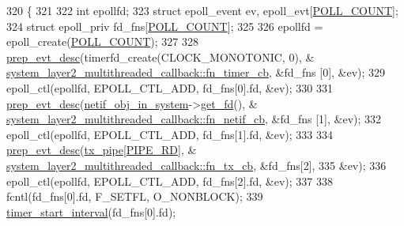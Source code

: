 \begin{DoxyCode}
320 \{
321 
322     \textcolor{keywordtype}{int} epollfd;
323     \textcolor{keyword}{struct }epoll\_event ev, epoll\_evt[\hyperlink{classavdecc__lib_1_1system__layer2__multithreaded__callback_a617559bbc3d02eeb189fad2c9979ef53a524137542af79e43a9d8f75c2f0511be}{POLL\_COUNT}];
324     \textcolor{keyword}{struct }epoll\_priv fd\_fns[\hyperlink{classavdecc__lib_1_1system__layer2__multithreaded__callback_a617559bbc3d02eeb189fad2c9979ef53a524137542af79e43a9d8f75c2f0511be}{POLL\_COUNT}];
325 
326     epollfd = epoll\_create(\hyperlink{classavdecc__lib_1_1system__layer2__multithreaded__callback_a617559bbc3d02eeb189fad2c9979ef53a524137542af79e43a9d8f75c2f0511be}{POLL\_COUNT});
327 
328     \hyperlink{classavdecc__lib_1_1system__layer2__multithreaded__callback_ad45575cb73c470467150d44e2051ceb6}{prep\_evt\_desc}(timerfd\_create(CLOCK\_MONOTONIC, 0), &
      \hyperlink{classavdecc__lib_1_1system__layer2__multithreaded__callback_ab09283b3cef1ee9a8c8664181b87f677}{system\_layer2\_multithreaded\_callback::fn\_timer\_cb}, &fd\_fns
      [0], &ev);
329     epoll\_ctl(epollfd, EPOLL\_CTL\_ADD, fd\_fns[0].fd, &ev);
330 
331     \hyperlink{classavdecc__lib_1_1system__layer2__multithreaded__callback_ad45575cb73c470467150d44e2051ceb6}{prep\_evt\_desc}(\hyperlink{namespaceavdecc__lib_aa02659d86782158e7934e97da042e57a}{netif\_obj\_in\_system}->\hyperlink{classavdecc__lib_1_1net__interface__imp_ac46dfce80aaa93ac5fbb8df77bcdb6ce}{get\_fd}(), &
      \hyperlink{classavdecc__lib_1_1system__layer2__multithreaded__callback_a63fb99460e4c14516895f7143b1d54ff}{system\_layer2\_multithreaded\_callback::fn\_netif\_cb}, &fd\_fns
      [1], &ev);
332     epoll\_ctl(epollfd, EPOLL\_CTL\_ADD, fd\_fns[1].fd, &ev);
333 
334     \hyperlink{classavdecc__lib_1_1system__layer2__multithreaded__callback_ad45575cb73c470467150d44e2051ceb6}{prep\_evt\_desc}(\hyperlink{classavdecc__lib_1_1system__layer2__multithreaded__callback_a3709435136aa29f099b91ff297640b5b}{tx\_pipe}[\hyperlink{classavdecc__lib_1_1system__layer2__multithreaded__callback_a617559bbc3d02eeb189fad2c9979ef53a34b39c5d9253fea845d499c840c5fe60}{PIPE\_RD}], &
      \hyperlink{classavdecc__lib_1_1system__layer2__multithreaded__callback_a4a9be0424c86a39d845718179eccbc18}{system\_layer2\_multithreaded\_callback::fn\_tx\_cb}, &fd\_fns[2],
335                   &ev);
336     epoll\_ctl(epollfd, EPOLL\_CTL\_ADD, fd\_fns[2].fd, &ev);
337 
338     fcntl(fd\_fns[0].fd, F\_SETFL, O\_NONBLOCK);
339     \hyperlink{classavdecc__lib_1_1system__layer2__multithreaded__callback_ae921ed6f4870489118b852f37e353a1e}{timer\_start\_interval}(fd\_fns[0].fd);

\end{DoxyCode}
